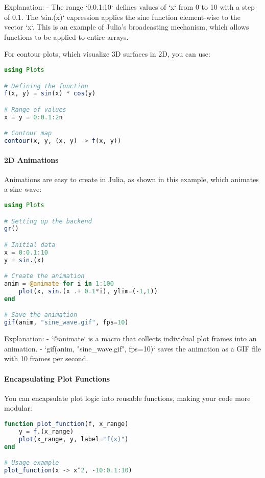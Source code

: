 Explanation:
- The range `0:0.1:10` defines values of `x` from 0 to 10 with a step of 0.1. The `sin.(x)` expression applies the sine function element-wise to the vector `x`. This is an example of Julia's broadcasting mechanism, which allows functions to be applied to entire arrays.

For contour plots, which visualize 3D surfaces in 2D, you can use:

\begin{lstlisting}[language=Julia]
using Plots

# Defining the function
f(x, y) = sin(x) * cos(y)

# Range of values
x = y = 0:0.1:2π

# Contour map
contour(x, y, (x, y) -> f(x, y))
\end{lstlisting}

\paragraph{2D Animations}
Animations are easy to create in Julia, as shown in this example, which animates a sine wave:

\begin{lstlisting}[language=Julia]
using Plots

# Setting up the backend
gr()

# Initial data
x = 0:0.1:10
y = sin.(x)

# Create the animation
anim = @animate for i in 1:100
    plot(x, sin.(x .+ 0.1*i), ylim=(-1,1))
end

# Save the animation
gif(anim, "sine_wave.gif", fps=10)
\end{lstlisting}

Explanation:
- `@animate` is a macro that collects individual plot frames into an animation.
- `gif(anim, "sine\_wave.gif", fps=10)` saves the animation as a GIF file with 10 frames per second.

\paragraph{Encapsulating Plot Functions}
You can encapsulate plot logic into reusable functions, making your code more modular:

\begin{lstlisting}[language=Julia]
function plot_function(f, x_range)
    y = f.(x_range)
    plot(x_range, y, label="f(x)")
end

# Usage example
plot_function(x -> x^2, -10:0.1:10)
\end{lstlisting}

